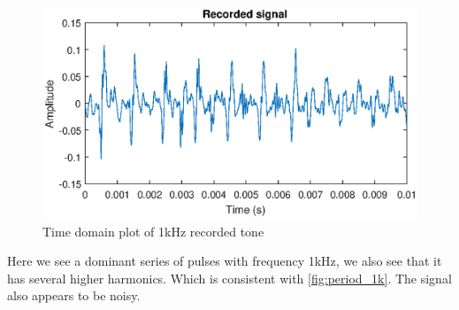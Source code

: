 \begin{figure}[H]
    \centering
    \includegraphics[trim={0cm 1.6cm 0cm 2cm},clip,width=\textwidth]{img/Recorded_1khz-09.eps}
    \caption{Time domain plot of 1kHz recorded tone}
    \label{fig:recorded_1k}
\end{figure}

Here we see a dominant series of pulses with frequency 1kHz, we also see that it has several higher harmonics. Which is consistent with \cref{fig:period_1k}. The signal also appears to be noisy.


